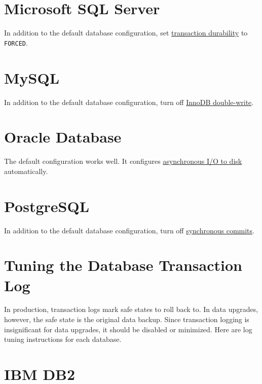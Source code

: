 \section{Microsoft SQL Server}\label{microsoft-sql-server}

In addition to the default database configuration, set
\href{https://docs.microsoft.com/en-us/sql/relational-databases/logs/control-transaction-durability}{transaction
durability} to \texttt{FORCED}.

\section{MySQL}\label{mysql}

In addition to the default database configuration, turn off
\href{https://dev.mysql.com/doc/refman/5.7/en/innodb-parameters.html\#sysvar_innodb_doublewrite}{InnoDB
double-write}.

\section{Oracle Database}\label{oracle-database}

The default configuration works well. It configures
\href{https://docs.oracle.com/database/121/REFRN/GUID-FD8D1BD2-0F85-4844-ABE7-57B4F77D1608.htm\#REFRN10048}{asynchronous
I/O to disk} automatically.

\section{PostgreSQL}\label{postgresql}

In addition to the default database configuration, turn off
\href{https://www.postgresql.org/docs/10/wal-async-commit.html}{synchronous
commits}.

\section{Tuning the Database Transaction
Log}\label{tuning-the-database-transaction-log}

In production, transaction logs mark safe states to roll back to. In
data upgrades, however, the safe state is the original data backup.
Since transaction logging is insignificant for data upgrades, it should
be disabled or minimized. Here are log tuning instructions for each
database.

\section{IBM DB2}\label{ibm-db2-1}

